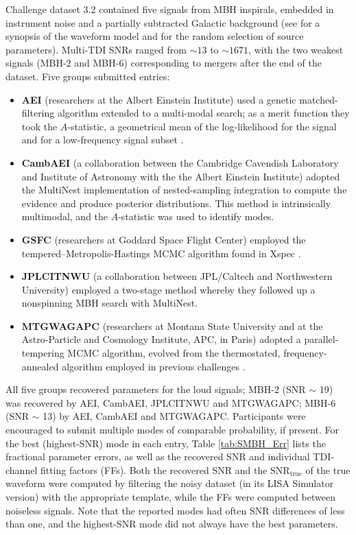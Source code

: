 \documentclass{iopart}
\begin{document}
Challenge dataset 3.2 contained five signals from MBH inspirals, embedded in instrument noise and a partially subtracted Galactic background (see \cite{MLDC3} for a synopsis of the waveform model and for the random selection of source parameters). Multi-TDI SNRs ranged from $\sim 13$ to $\sim 1671$, with the two weakest signals (MBH-2 and MBH-6) corresponding to mergers after the end of the dataset. Five groups submitted entries:
%
\begin{itemize}
\item \textbf{AEI} (researchers at the Albert Einstein Institute) used a genetic matched-filtering algorithm extended to a multi-modal search; as a merit function they took the $A$-statistic, a geometrical mean of the log-likelihood for the signal and for a low-frequency signal subset \cite{GAspinbbhFullPaper}.
\item \textbf{CambAEI} (a collaboration between the Cambridge Cavendish Laboratory and Institute of Astronomy with the the Albert Einstein Institute) adopted the MultiNest implementation of nested-sampling integration \cite{MultiNest2} to compute the evidence and produce posterior distributions. This method is intrinsically multimodal, and the $A$-statistic was used to identify modes.
\item \textbf{GSFC} (researchers at Goddard Space Flight Center) employed the tempered--Metropolis-Hastings MCMC algorithm found in Xspec \cite{Xspec}. 
\item \textbf{JPLCITNWU} (a collaboration between JPL/Caltech and Northwestern University) employed a two-stage method whereby they followed up a nonspinning MBH search \cite{JPLCaltech} with MultiNest.
\item \textbf{MTGWAGAPC} (researchers at Montana State University and at the Astro-Particle and Cosmology Institute, APC, in Paris) adopted a parallel-tempering MCMC algorithm, evolved from the thermostated, frequency-annealed algorithm employed in previous challenges \cite{SMBHCornishPorter}.
\end{itemize}
%
All five groups recovered parameters for the loud signals; MBH-2 (SNR $\sim$ 19) was recovered by AEI, CambAEI, JPLCITNWU and MTGWAGAPC; MBH-6 (SNR $\sim$ 13) by AEI, CambAEI and MTGWAGAPC. Participants were encouraged to submit multiple modes of comparable probability, if present. For the best (highest-SNR) mode in each entry, Table \ref{tab:SMBH_Err} lists the fractional parameter errors, as well as the recovered SNR and individual TDI-channel fitting factors (FFs). Both the recovered SNR and the $\mathrm{SNR}_\mathrm{true}$ of the true waveform were computed by filtering the noisy dataset (in its LISA Simulator version) with the appropriate template, while the FFs were computed between noiseless signals. Note that the reported modes had often SNR differences of less than one, and the highest-SNR mode did not always have the best parameters.
\end{document}
